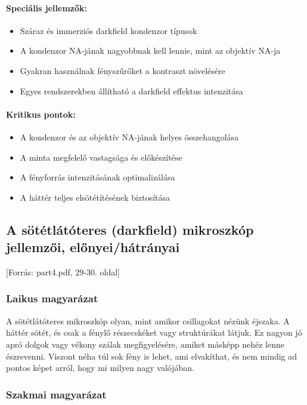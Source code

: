 \documentclass[a4paper,12pt]{article}
\begin{document}
\paragraph{Speciális jellemzők:} \begin{itemize} \item Száraz és immerziós darkfield kondenzor típusok \item A kondenzor NA-jának nagyobbnak kell lennie, mint az objektív NA-ja \item Gyakran használnak fényszűrőket a kontraszt növelésére \item Egyes rendszerekben állítható a darkfield effektus intenzitása \end{itemize}

\paragraph{Kritikus pontok:} \begin{itemize} \item A kondenzor és az objektív NA-jának helyes összehangolása \item A minta megfelelő vastagsága és előkészítése \item A fényforrás intenzitásának optimalizálása \item A háttér teljes elsötétítésének biztosítása \end{itemize}

\subsection{A sötétlátóteres (darkfield) mikroszkóp jellemzői, előnyei/hátrányai} [Forrás: part4.pdf, 29-30. oldal]

\subsubsection{Laikus magyarázat} A sötétlátóteres mikroszkóp olyan, mint amikor csillagokat nézünk éjszaka. A háttér sötét, és csak a fénylő részecskéket vagy struktúrákat látjuk. Ez nagyon jó apró dolgok vagy vékony szálak megfigyelésére, amiket másképp nehéz lenne észrevenni. Viszont néha túl sok fény is lehet, ami elvakíthat, és nem mindig ad pontos képet arról, hogy mi milyen nagy valójában.

\subsubsection{Szakmai magyarázat}
\end{document}
